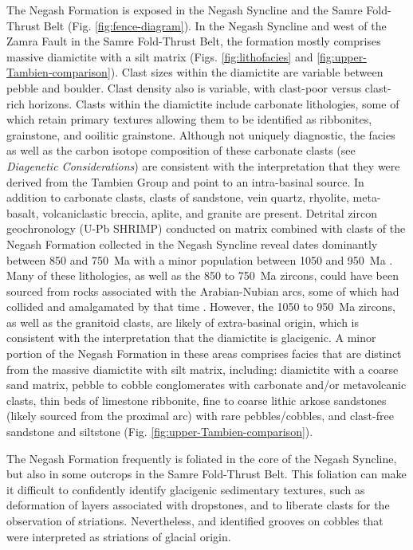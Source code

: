 The Negash Formation is exposed in the Negash Syncline and the Samre Fold-Thrust Belt (Fig. \ref{fig:fence-diagram}). In the Negash Syncline and west of the Zamra Fault in the Samre Fold-Thrust Belt, the formation mostly comprises massive diamictite with a silt matrix (Figs. \ref{fig:lithofacies} and \ref{fig:upper-Tambien-comparison}). Clast sizes within the diamictite are variable between pebble and boulder. Clast density also is variable, with clast-poor versus clast-rich horizons. Clasts within the diamictite include carbonate lithologies, some of which retain primary textures allowing them to be identified as ribbonites, grainstone, and ooilitic grainstone. Although not uniquely diagnostic, the facies as well as the carbon isotope composition of these carbonate clasts (see \textit{Diagenetic Considerations}) are consistent with the interpretation that they were derived from the Tambien Group and point to an intra-basinal source. In addition to carbonate clasts, clasts of sandstone, vein quartz, rhyolite, meta-basalt, volcaniclastic breccia, aplite, and granite are present. Detrital zircon geochronology (U-Pb SHRIMP) conducted on matrix combined with clasts of the Negash Formation collected in the Negash Syncline reveal dates dominantly between 850 and 750~Ma with a minor population between 1050 and 950~Ma \citep{Avigad2007a}. Many of these lithologies, as well as the 850 to 750~Ma zircons, could have been sourced from rocks associated with the Arabian-Nubian arcs, some of which had collided and amalgamated by that time \citep{Johnson2014a}. However, the 1050 to 950~Ma zircons, as well as the granitoid clasts, are likely of extra-basinal origin, which is consistent with the interpretation that the diamictite is glacigenic. A minor portion of the Negash Formation in these areas comprises facies that are distinct from the massive diamictite with silt matrix, including: diamictite with a coarse sand matrix, pebble to cobble conglomerates with carbonate and/or metavolcanic clasts, thin beds of limestone ribbonite, fine to coarse lithic arkose sandstones (likely sourced from the proximal arc) with rare pebbles/cobbles, and clast-free sandstone and siltstone (Fig. \ref{fig:upper-Tambien-comparison}).

The Negash Formation frequently is foliated in the core of the Negash Syncline, but also in some outcrops in the Samre Fold-Thrust Belt. This foliation can make it difficult to confidently identify glacigenic sedimentary textures, such as deformation of layers associated with dropstones, and to liberate clasts for the observation of striations. Nevertheless, \citet{MacLennan2018a} and \citet{Miller2003a} identified grooves on cobbles that were interpreted as striations of glacial origin.

